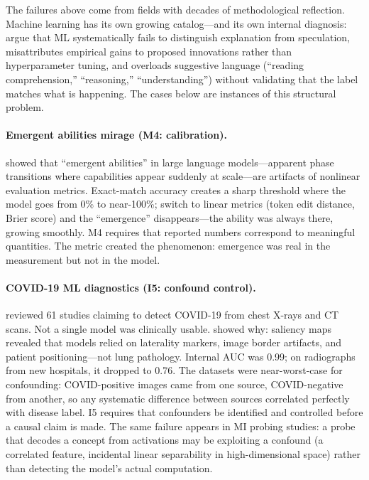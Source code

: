 \documentclass{article}
\begin{document}
The failures above come from fields with decades of methodological reflection. Machine learning has its own growing catalog---and its own internal diagnosis: \citet{lipton2019troubling} argue that ML systematically fails to distinguish explanation from speculation, misattributes empirical gains to proposed innovations rather than hyperparameter tuning, and overloads suggestive language (``reading comprehension,'' ``reasoning,'' ``understanding'') without validating that the label matches what is happening. The cases below are instances of this structural problem.

\paragraph{Emergent abilities mirage (M4: calibration).}
\citet{schaeffer2024emergent} showed that ``emergent abilities'' in large language models---apparent phase transitions where capabilities appear suddenly at scale---are artifacts of nonlinear evaluation metrics. Exact-match accuracy creates a sharp threshold where the model goes from 0\% to near-100\%; switch to linear metrics (token edit distance, Brier score) and the ``emergence'' disappears---the ability was always there, growing smoothly. M4 requires that reported numbers correspond to meaningful quantities. The metric created the phenomenon: emergence was real in the measurement but not in the model.

\paragraph{COVID-19 ML diagnostics (I5: confound control).}
\citet{roberts2021common} reviewed 61 studies claiming to detect COVID-19 from chest X-rays and CT scans. Not a single model was clinically usable. \citet{degrave2021ai} showed why: saliency maps revealed that models relied on laterality markers, image border artifacts, and patient positioning---not lung pathology. Internal AUC was 0.99; on radiographs from new hospitals, it dropped to 0.76. The datasets were near-worst-case for confounding: COVID-positive images came from one source, COVID-negative from another, so any systematic difference between sources correlated perfectly with disease label. I5 requires that confounders be identified and controlled before a causal claim is made. The same failure appears in MI probing studies: a probe that decodes a concept from activations may be exploiting a confound (a correlated feature, incidental linear separability in high-dimensional space) rather than detecting the model's actual computation.
\end{document}
